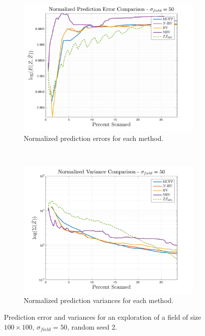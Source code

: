 \begin{figure}[htb!]
    \centering
    \begin{subfigure}[t]{0.75\textwidth}
        \centering
        \includegraphics[width=\linewidth]{figures/normalized_errors_30p_100x100_sf_50_seed_2_app_10.png}
        \captionsetup{skip=0.20\baselineskip,size=footnotesize}
        \caption{Normalized prediction errors for each method.}
    \end{subfigure}%
    \\
    \begin{subfigure}[t]{0.75\textwidth}
        \centering
        \includegraphics[width=\linewidth]{figures/normalized_variances_30p_100x100_sf_50_seed_2_app_10.png}
        \captionsetup{skip=0.20\baselineskip,size=footnotesize}
        \caption{Normalized prediction variances for each method.}
    \end{subfigure}%
    \captionsetup{skip=0.20\baselineskip}
    \caption{Prediction error and variances for an exploration of a field of size $100 \times 100$, $\sigma_{field} = 50$, random seed 2.}
    \label{fig:errvar50}
\end{figure}

